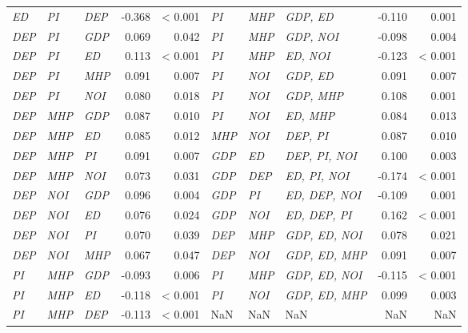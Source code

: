 \begin{tabular}{lllrr|lllrr}
\textit{ED} & \textit{PI} & \textit{DEP} & -0.368 & \textless{} 0.001 & \textit{PI} & \textit{MHP} & \textit{GDP, ED} & -0.110 & 0.001 \\
\textit{DEP} & \textit{PI} & \textit{GDP} & 0.069 & 0.042 & \textit{PI} & \textit{MHP} & \textit{GDP, NOI} & -0.098 & 0.004 \\
\textit{DEP} & \textit{PI} & \textit{ED} & 0.113 & \textless{} 0.001 & \textit{PI} & \textit{MHP} & \textit{ED, NOI} & -0.123 & \textless{} 0.001 \\
\textit{DEP} & \textit{PI} & \textit{MHP} & 0.091 & 0.007 & \textit{PI} & \textit{NOI} & \textit{GDP, ED} & 0.091 & 0.007 \\
\textit{DEP} & \textit{PI} & \textit{NOI} & 0.080 & 0.018 & \textit{PI} & \textit{NOI} & \textit{GDP, MHP} & 0.108 & 0.001 \\
\textit{DEP} & \textit{MHP} & \textit{GDP} & 0.087 & 0.010 & \textit{PI} & \textit{NOI} & \textit{ED, MHP} & 0.084 & 0.013 \\
\textit{DEP} & \textit{MHP} & \textit{ED} & 0.085 & 0.012 & \textit{MHP} & \textit{NOI} & \textit{DEP, PI} & 0.087 & 0.010 \\
\textit{DEP} & \textit{MHP} & \textit{PI} & 0.091 & 0.007 & \textit{GDP} & \textit{ED} & \textit{DEP, PI, NOI} & 0.100 & 0.003 \\
\textit{DEP} & \textit{MHP} & \textit{NOI} & 0.073 & 0.031 & \textit{GDP} & \textit{DEP} & \textit{ED, PI, NOI} & -0.174 & \textless{} 0.001 \\
\textit{DEP} & \textit{NOI} & \textit{GDP} & 0.096 & 0.004 & \textit{GDP} & \textit{PI} & \textit{ED, DEP, NOI} & -0.109 & 0.001 \\
\textit{DEP} & \textit{NOI} & \textit{ED} & 0.076 & 0.024 & \textit{GDP} & \textit{NOI} & \textit{ED, DEP, PI} & 0.162 & \textless{} 0.001 \\
\textit{DEP} & \textit{NOI} & \textit{PI} & 0.070 & 0.039 & \textit{DEP} & \textit{MHP} & \textit{GDP, ED, NOI} & 0.078 & 0.021 \\
\textit{DEP} & \textit{NOI} & \textit{MHP} & 0.067 & 0.047 & \textit{DEP} & \textit{NOI} & \textit{GDP, ED, MHP} & 0.091 & 0.007 \\
\textit{PI} & \textit{MHP} & \textit{GDP} & -0.093 & 0.006 & \textit{PI} & \textit{MHP} & \textit{GDP, ED, NOI} & -0.115 & \textless{} 0.001 \\
\textit{PI} & \textit{MHP} & \textit{ED} & -0.118 & \textless{} 0.001 & \textit{PI} & \textit{NOI} & \textit{GDP, ED, MHP} & 0.099 & 0.003 \\
\textit{PI} & \textit{MHP} & \textit{DEP} & -0.113 & \textless{} 0.001 & NaN & NaN & NaN & NaN & NaN \\
\bottomrule
\end{tabular}

